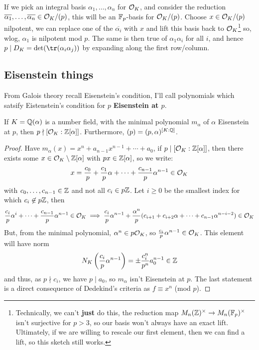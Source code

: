 \documentclass{article}
\begin{document}
If we pick an integral basis $\alpha_1,\ldots,\alpha_n$ for $\mathcal{O}_K$, and consider the reduction $\overline{\alpha_1},\ldots,\overline{\alpha_n}\in\mathcal{O}_K/(p)$, this  will be an $\mathbb{F}_p$-basis for $\mathcal{O}_K/(p)$. Choose $x\in\mathcal{O}_K/(p)$ nilpotent, we can replace one of the $\overline{\alpha_i}$ with $x$ and lift this basis back to $\mathcal{O}_K$\footnote{Technically, we can't \textbf{just} do this, the reduction map $M_n(\mathbb{Z})^\times\rightarrow M_n(\mathbb{F}_p)^\times$ isn't surjective for $p>3$, so our basis won't always have an exact lift. Ultimately, if we are willing to rescale our first element, then we can find a lift, so this sketch still works.} so, wlog, $\alpha_1$ is nilpotent mod $p$. The same is then true of $\alpha_1\alpha_i$ for all $i$, and hence $p\mid D_K=\det(\tr(\alpha_i\alpha_j))$ by expanding along the first row/column.

\subsection{Eisenstein things}

From Galois theory recall Eisenstein's condition, I'll call polynomials which satsify Eistenstein's condition for $p$ \textbf{Eisenstein at $p$}.

\begin{proposition}
    If $K=\mathbb{Q}(\alpha)$ is a number field, with the minimal polynomial $m_\alpha$ of $\alpha$ Eisenstein at $p$, then $p\nmid [\mathcal{O}_K:\mathbb{Z}[\alpha]]$. Furthermore, $(p)=(p,\alpha)^{[K:\mathbb{Q}]}$.
    \begin{proof}
        Have $m_\alpha(x)=x^n+a_{n-1}x^{n-1}+\cdots+a_0$, if $p\mid [\mathcal{O}_K:\mathbb{Z}[\alpha]]$, then there exists some $x\in\mathcal{O}_K\setminus \mathbb{Z}[\alpha]$ with $px\in\mathbb{Z}[\alpha]$, so we write: \vspace{-12pt}\[
        x = \frac{c_0}{p} + \frac{c_1}{p}\alpha + \cdots + \frac{c_{n-1}}{p}\alpha^{n-1}\in\mathcal{O}_K
        \] with $c_0,\ldots,c_{n-1}\in\mathbb{Z}$ and not all $c_i\in p\mathbb{Z}$. Let $i\geq 0$ be the smallest index for which $c_i\not\in p\mathbb{Z}$, then \[
        \frac{c_i}{p}\alpha^i + \cdots + \frac{c_{n-1}}{p}\alpha^{n-1}\in \mathcal{O}_K \implies \frac{c_i}{p}\alpha^{n-1} + \frac{\alpha^n}{p}(c_{i+1}+c_{i+2}\alpha + \cdots + c_{n-1}\alpha^{n-i-2})\in\mathcal{O}_K
        \] But, from the minimal polynomial, $\alpha^n\in p\mathcal{O}_K$, so $\frac{c_i}{p}\alpha^{n-1}\in\mathcal{O}_K$. This element will have norm \[
        N_K\left( \frac{c_i}{p}\alpha^{n-1} \right) = \pm\frac{c_i^n}{p^n}a_0^{n-1}\in\mathbb{Z}
        \] and thus, as $p\nmid c_i$, we have $p\mid a_0$, so $m_\alpha$ isn't Eisenstein at $p$. The last statement is a direct consequence of Dedekind's criteria as $f\equiv x^n$ (mod $p$).
    \end{proof}
\end{proposition}
\end{document}
